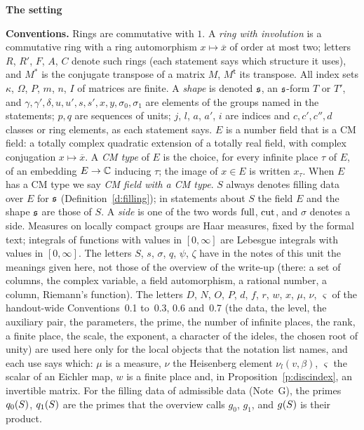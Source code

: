 \documentclass[11pt,a4paper]{article}
\newcommand{\sect}[2]{\refstepcounter{section}\label{#2}\par\addvspace{19pt plus 4pt minus 2pt}\Needspace{7\baselineskip}%
  \noindent\llap{{\fontsize{13.2}{16}\selectfont\bfseries\color{inkfaint}\thesection}\hspace{9pt}}%
  {\fontsize{13.2}{16}\selectfont\bfseries\color{ink}#1}\par\nopagebreak\vspace{-1pt}}
\theoremstyle{plainx}
\theoremstyle{uprightx}
\newenvironment{conventions}{\par\addvspace{5pt}\noindent\textbf{Conventions.}\enspace\ignorespaces}{\par\addvspace{3pt}}
\newcommand{\cj}[1]{\overline{#1}}                  %
\newcommand{\adj}[1]{#1^{*}}                        %
\newcommand{\tr}[1]{#1^{\mathsf{t}}}                %
\newcommand{\at}[2]{#1_{#2}}                        %
\begin{document}
\sect{The setting}{s:setting}
\begin{conventions}\label{c:conventions}
Rings are commutative with $1$. A \emph{ring with involution} is a commutative ring with a ring automorphism
$x\mapsto\cj{x}$ of order at most two; letters $R$, $R'$, $F$, $A$, $C$ denote such rings (each statement says which
structure it uses), and $\adj{M}$ is the conjugate transpose of a matrix $M$, $\tr{M}$ its transpose. All index sets
$\kappa$, $\Omega$, $P$, $m$, $n$, $I$ of matrices are finite. A \emph{shape} is denoted $\fs$, an $\fs$-form $T$ or
$T'$, and $\gamma,\gamma',\delta,u,u',s,s',x,y,\sigma_0,\sigma_1$ are elements of the groups named in the statements;
$p,q$ are sequences of units; $j$, $l$, $a$, $a'$, $i$ are indices and $c,c',c'',d$ classes or ring elements, as each
statement says. $E$ is a number field that is a CM field: a totally complex quadratic extension of a totally real
field, with complex conjugation $x\mapsto\cj{x}$. A \emph{CM type} of $E$ is the choice, for every infinite place
$\tau$ of $E$, of an embedding $E\to\CC$ inducing $\tau$; the image of $x\in E$ is written $\at{x}{\tau}$. When $E$
has a CM type we say \emph{CM field with a CM type}. $S$ always denotes filling data over $E$ for $\fs$
(Definition~\ref{d:filling}); in statements about $S$ the field $E$ and the shape $\fs$ are those of $S$. A
\emph{side} is one of the two words $\full$, $\cut$, and $\sigma$ denotes a side. Measures on locally compact groups
are Haar measures, fixed by the formal text; integrals of functions with values in $[0,\infty]$ are Lebesgue
integrals with values in $[0,\infty]$. The letters $S$, $s$, $\sigma$, $q$, $\psi$, $\zeta$ have in the notes of this
unit the meanings given here, not those of the overview of the write-up (there: a set of columns, the complex
variable, a field automorphism, a rational number, a column, Riemann's function). The letters $D$, $N$, $O$, $P$, $d$, $f$, $r$, $w$, $x$, $\mu$, $\nu$, $\varsigma$ of
the handout-wide Conventions~0.1 to~0.3, 0.6 and~0.7 (the data, the level, the auxiliary pair, the parameters, the prime, the
number of infinite places, the rank, a finite place, the scale, the exponent, a character of the ideles, the chosen root of
unity) are used here only for the local objects that the notation list names, and each use says which: $\mu$ is a measure, $\nu$ the
Heisenberg element $\nu_l(v,\beta)$, $\varsigma$ the scalar of an Eichler map, $w$ is a finite place and, in
Proposition~\ref{p:discindex}, an invertible matrix. For the filling data of admissible
data (Note~G), the primes $\qS{S}{0}$, $\qS{S}{1}$ are the primes that the overview calls $g_0$, $g_1$, and $\gS{S}$ is
their product.
\end{conventions}
\end{document}
